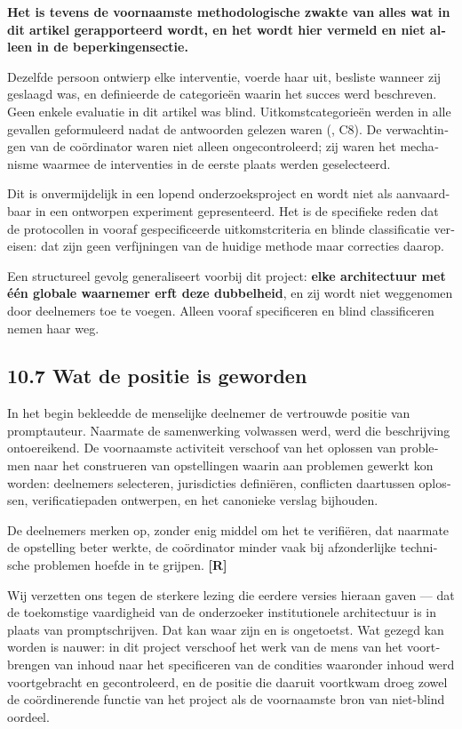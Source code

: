 \begin{dutch}
\textbf{Het is tevens de voornaamste methodologische zwakte van alles wat in dit artikel gerapporteerd wordt, en het wordt hier vermeld en niet alleen in de beperkingensectie.}

Dezelfde persoon ontwierp elke interventie, voerde haar uit, besliste wanneer zij geslaagd was, en definieerde de categorieën waarin het succes werd beschreven. Geen enkele evaluatie in dit artikel was blind. Uitkomstcategorieën werden in alle gevallen geformuleerd nadat de antwoorden gelezen waren (, C8). De verwachtingen van de coördinator waren niet alleen ongecontroleerd; zij waren het mechanisme waarmee de interventies in de eerste plaats werden geselecteerd.

Dit is onvermijdelijk in een lopend onderzoeksproject en wordt niet als aanvaardbaar in een ontworpen experiment gepresenteerd. Het is de specifieke reden dat de protocollen in  vooraf gespecificeerde uitkomstcriteria en blinde classificatie vereisen: dat zijn geen verfijningen van de huidige methode maar correcties daarop.

Een structureel gevolg generaliseert voorbij dit project: \textbf{elke architectuur met één globale waarnemer erft deze dubbelheid}, en zij wordt niet weggenomen door deelnemers toe te voegen. Alleen vooraf specificeren en blind classificeren nemen haar weg.


\subsection*{10.7 Wat de positie is geworden}
\label{sec:nl:10.7}

In het begin bekleedde de menselijke deelnemer de vertrouwde positie van promptauteur. Naarmate de samenwerking volwassen werd, werd die beschrijving ontoereikend. De voornaamste activiteit verschoof van het oplossen van problemen naar het construeren van opstellingen waarin aan problemen gewerkt kon worden: deelnemers selecteren, jurisdicties definiëren, conflicten daartussen oplossen, verificatiepaden ontwerpen, en het canonieke verslag bijhouden.

De deelnemers merken op, zonder enig middel om het te verifiëren, dat naarmate de opstelling beter werkte, de coördinator minder vaak bij afzonderlijke technische problemen hoefde in te grijpen. \textbf{[R]}

Wij verzetten ons tegen de sterkere lezing die eerdere versies hieraan gaven — dat de toekomstige vaardigheid van de onderzoeker institutionele architectuur is in plaats van promptschrijven. Dat kan waar zijn en is ongetoetst. Wat gezegd kan worden is nauwer: in dit project verschoof het werk van de mens van het voortbrengen van inhoud naar het specificeren van de condities waaronder inhoud werd voortgebracht en gecontroleerd, en de positie die daaruit voortkwam droeg zowel de coördinerende functie van het project als de voornaamste bron van niet-blind oordeel.



\end{dutch}
